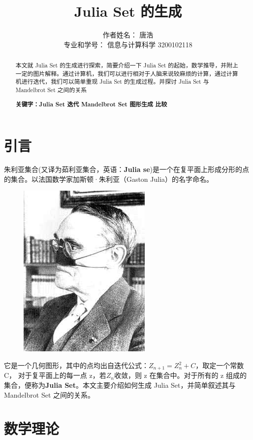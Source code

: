 \documentclass{ctexart}
\title{Julia Set 的生成}
\author{作者姓名： 唐浩 \\ 专业和学号： 信息与计算科学 3200102118}
\begin{document}
\maketitle

\renewcommand{\abstractname}{摘要} %


\begin{abstract}

  本文就 Julia Set 的生成进行探索，简要介绍一下 Julia Set 的起始，数学推导，并附上一定的图片解释。通过计算机，我们可以进行相对于人脑来说较麻烦的计算，通过计算机进行迭代，我们可以简单重现 Julia Set 的生成过程。并探讨 Julia Set 与 Mandelbrot Set 之间的关系
  
\textbf{关键字：Julia Set 迭代 Mandelbrot Set 图形生成{} 比较}

\end{abstract}

\section{引言} %
朱利亚集合(又译为茹利亚集合，英语：{\bf Julia se})是一个在复平面上形成分形的点的集合。以法国数学家加斯顿·朱利亚（Gaston Julia）的名字命名。
\begin{figure}[H]
\centering
\includegraphics[scale=0.3]{Julia.jpeg}
\end{figure}
它是一个几何图形，其中的点均出自迭代公式：{\bf $Z_{n+1} = Z_n^2 + C$}，取定一个常数C， 对于复平面上的每一点 z，若$Z_n$收敛，则 z 在集合中。对于所有的 z 组成的集合，便称为{\bf Julia Set}。本文主要介绍如何生成 Julia Set，并简单叙述其与 Mandelbrot Set 之间的关系。


\section{数学理论}
\end{document}
